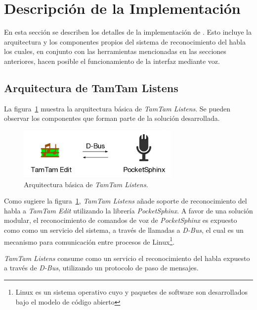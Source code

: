 \section{Descripci\'on de la Implementaci\'on}
\label{sec:descripcion-implementacion}

En esta secci\'on se describen los detalles de la implementaci\'on de .
Esto incluye la arquitectura y los componentes propios del sistema de reconocimiento del habla
los cuales, en conjunto con las herramientas mencionadas en las secciones anteriores, hacen posible
el funcionamiento de la interfaz mediante voz. 

\subsection{Arquitectura de TamTam Listens}
\label{sec:arquitectura-solucion}

La figura~\ref{figure:tamtam-listens-arq} muestra la arquitectura b\'asica de \emph{TamTam Listens}. Se 
pueden observar los componentes que forman parte de la soluci\'on desarrollada.

\begin{figure}[H] 
\centering
\includegraphics[width=0.7\textwidth]{./graphics/tamtam-listens-arq.png}
\caption{Arquitectura b\'asica de \emph{TamTam Listens}.}
\label{figure:tamtam-listens-arq}
\end{figure}

Como sugiere la figura~\ref{figure:tamtam-listens-arq}, \emph{TamTam Listens} a\~nade soporte 
de reconocimiento del habla a \emph{TamTam Edit} utilizando la librer\'ia \emph{PocketSphinx}.
A favor de una soluci\'on modular, el reconocimiento de comandos de voz de \emph{PocketSphinx} 
es expuesto como como un  servicio del sistema, a trav\'es de llamadas a \emph{D-Bus}\cite{Dbus2013},
el cual es un mecanismo para comunicaci\'on entre procesos de Linux\footnote{Linux es un sistema operativo
cuyo  y paquetes de software son desarrollados bajo el modelo de c\'odigo abierto\cite{LinuxGuideCert}}.

\emph{TamTam Listens} consume como un servicio el reconocimiento del habla expuesto a trav\'es de 
\emph{D-Bus}, utilizando un protocolo de paso de mensajes.


